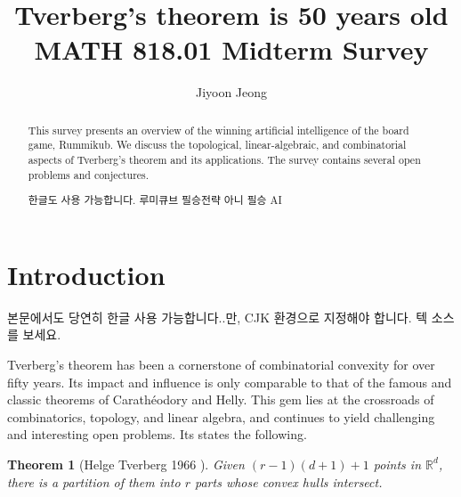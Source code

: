 \documentclass[11pt]{article}
\title{Tverberg's theorem is 50 years old\\
	\large MATH 818.01 Midterm Survey
}
\author{Jiyoon Jeong}
\date{}
\newtheorem{theorem}{Theorem}
\newcommand{\rr}{\mathbb{R}}
\DeclareMathOperator{\conv}{conv}
\begin{document}
	
	\maketitle
	
	\begin{abstract}
		This survey presents an overview of the winning artificial intelligence of the board game, Rummikub.  We discuss the topological, linear-algebraic, and combinatorial aspects of Tverberg's theorem and its applications.  The survey contains several open problems and conjectures.
		\begin{CJK}{UTF8}{mj}
			한글도 사용 가능합니다. 루미큐브 필승전략 아니 필승 AI
		\end{CJK}
	\end{abstract}
	
	\section{Introduction}\label{section-introduction}
	
	\begin{CJK}{UTF8}{mj}
		본문에서도 당연히 한글 사용 가능합니다..만, CJK 환경으로 지정해야 합니다. 텍 소스를 보세요.
	\end{CJK}
	
	Tverberg's theorem has been a cornerstone of combinatorial convexity for over fifty years. Its impact and influence is only comparable to that of the famous and classic theorems of Carath\'eodory and Helly. This gem lies at the crossroads of combinatorics, topology, and linear algebra, and continues to yield challenging and interesting open problems.  Its states the following.%
	
	\begin{theorem}[Helge Tverberg 1966 \cite{Tverberg:1966tb}]
		Given $(r-1)(d+1)+1$ points in $\rr^d$, there is a partition of them into $r$ parts whose convex hulls intersect.
	\end{theorem}
	
\end{document}
